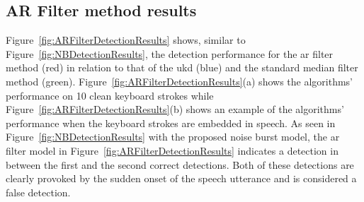 \subsection{AR Filter method results}
Figure~\ref{fig:ARFilterDetectionResults} shows, similar to Figure~\ref{fig:NBDetectionResults}, the detection performance for the \gls{ar} filter method (red) in relation to that of the \gls{ukd}\cite{Subramanya2007} (blue) and the standard median filter method (green). Figure~\ref{fig:ARFilterDetectionResults}(a) shows the algorithms' performance on 10 clean keyboard strokes while Figure~\ref{fig:ARFilterDetectionResults}(b) shows an example of the algorithms' performance when the keyboard strokes are embedded in speech. As seen in Figure~\ref{fig:NBDetectionResults} with the proposed noise burst model, the \gls{ar} filter model in Figure~\ref{fig:ARFilterDetectionResults} indicates a detection in between the first and the second correct detections. Both of these detections are clearly provoked by the sudden onset of the speech utterance and is considered a false detection.

